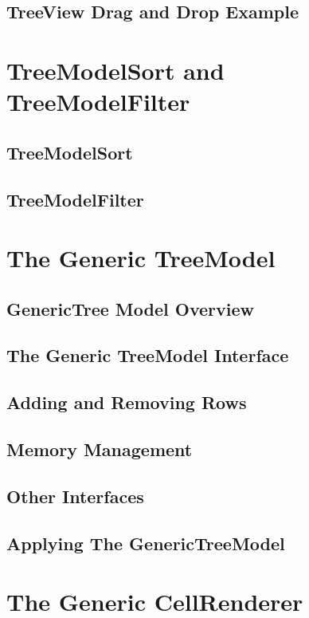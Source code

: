	\subsection{TreeView Drag and Drop Example}
\section{TreeModelSort and TreeModelFilter}
	\subsection{TreeModelSort}
	\subsection{TreeModelFilter}
\section{The Generic TreeModel}
\subsection{GenericTree Model Overview}
\subsection{The Generic TreeModel Interface}
\subsection{Adding and Removing Rows}
\subsection{Memory Management}
\subsection{Other Interfaces}
\subsection{Applying The GenericTreeModel}
\section{The Generic CellRenderer}
